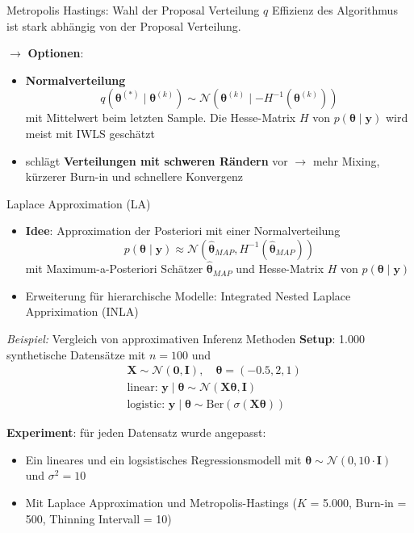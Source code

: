 \documentclass[
  ignorenonframetext,
  aspectratio=169,
]{beamer}
\providecommand{\tightlist}{%
  \setlength{\itemsep}{0pt}\setlength{\parskip}{0pt}}
\newcommand{\bnull}{\bm{0}}
\newcommand{\by}{\bm{y}}
\newcommand{\bI}{\bm{I}}
\newcommand{\bX}{\bm{X}}
\newcommand{\Ncal}{\mathcal{N}}
\newcommand{\ssd}{\sigma^2}
\newcommand{\btheta}{\bm{\theta}}
\newcommand{\hbtheta}{\hat{\bm{\theta}}}
\begin{document}
\begin{frame}{Metropolis Hastings: Wahl der Proposal Verteilung \(q\)}
\protect{}\label{metropolis-hastings-wahl-der-proposal-verteilung-q}
Effizienz des Algorithmus ist stark abhängig von der Proposal
Verteilung.

\(\to\) \textbf{Optionen}:

\begin{itemize}
\item
  \textbf{Normalverteilung} \[
  q(\btheta^{(*)} \mid \btheta^{(k)}) \sim \Ncal(\btheta^{(k)} \mid -H^{-1}(\btheta^{(k)}))
  \] mit Mittelwert beim letzten Sample. Die Hesse-Matrix \(H\) von
  \(p(\btheta \mid \by)\) wird meist mit IWLS geschätzt
  \autocite{gamerman_markov_1998,lenk_bayesian_2000,scott_data_2011}
\item
  \textcite{scott_data_2011} schlägt \textbf{Verteilungen mit schweren
  Rändern} vor \(\to\) mehr Mixing, kürzerer Burn-in und schnellere
  Konvergenz
\end{itemize}
\end{frame}

\begin{frame}{Laplace Approximation (LA)
\autocite{tierney_accurate_1986}}
\protect{}\label{laplace-approximation-la-tierney_accurate_1986}
\begin{itemize}
\tightlist
\item
  \textbf{Idee}: Approximation der Posteriori mit einer Normalverteilung
  \[
  p(\btheta \mid \by) \approx \Ncal(\hbtheta_{MAP}, H^{-1}(\hbtheta_{MAP}))
  \] mit Maximum-a-Posteriori Schätzer \(\hbtheta_{MAP}\) und
  Hesse-Matrix \(H\) von \(p(\btheta \mid \by)\)
\item
  Erweiterung für hierarchische Modelle: Integrated Nested Laplace
  Appriximation (INLA) \autocite{rue_approximate_2009}
\end{itemize}
\end{frame}

\begin{frame}{\emph{Beispiel:} Vergleich von approximativen Inferenz
Methoden}
\protect{}\label{beispiel-vergleich-von-approximativen-inferenz-methoden}
\textbf{Setup}: 1.000 synthetische Datensätze mit \(n=100\) und \[
\begin{aligned}
    &\bX \sim \Ncal(\bnull, \bI), \quad \btheta = (-0.5, 2, 1)\\
    &\text{linear: } \by \mid \btheta \sim \Ncal(\bX \btheta, \bI)\\
    &\text{logistic: } \by \mid \btheta \sim \text{Ber}(\sigma(\bX \btheta))
\end{aligned}
\]

\textbf{Experiment}: für jeden Datensatz wurde angepasst:

\begin{itemize}
\tightlist
\item
  Ein lineares und ein logsistisches Regressionsmodell mit
  \(\btheta \sim \Ncal(0, 10 \cdot \bI)\) und \(\ssd = 10\)
\item
  Mit Laplace Approximation und Metropolis-Hastings (\(K\) = 5.000,
  Burn-in = 500, Thinning Intervall = 10)
\end{itemize}
\end{frame}
\end{document}
